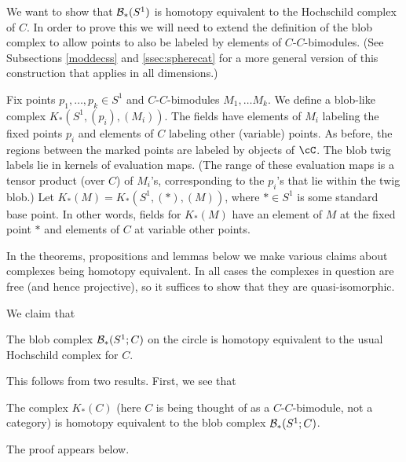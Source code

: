 We want to show that ${\mathcal B}_*(S^1)$ is homotopy equivalent to the
Hochschild complex of $C$.
In order to prove this we will need to extend the 
definition of the blob complex to allow points to also
be labeled by elements of $C$-$C$-bimodules.
(See Subsections \ref{moddecss} and \ref{ssec:spherecat} for a more general version of this construction that applies in all dimensions.)

Fix points $p_1, \ldots, p_k \in S^1$ and $C$-$C$-bimodules $M_1, \ldots M_k$.
We define a blob-like complex $K_*(S^1, (p_i), (M_i))$.
The fields have elements of $M_i$ labeling 
the fixed points $p_i$ and elements of $C$ labeling other (variable) points.
As before, the regions between the marked points are labeled by
objects of $\cC$.
The blob twig labels lie in kernels of evaluation maps.
(The range of these evaluation maps is a tensor product (over $C$) of $M_i$'s,
corresponding to the $p_i$'s that lie within the twig blob.)
Let $K_*(M) = K_*(S^1, (*), (M))$, where $* \in S^1$ is some standard base point.
In other words, fields for $K_*(M)$ have an element of $M$ at the fixed point $*$
and elements of $C$ at variable other points.

In the theorems, propositions and lemmas below we make various claims
about complexes being homotopy equivalent.
In all cases the complexes in question are free (and hence projective), 
so it suffices to show that they are quasi-isomorphic.

We claim that
\begin{thm}
\label{thm:hochschild}
The blob complex ${\mathcal B}_*(S^1; C)$ on the circle is homotopy equivalent to the
usual Hochschild complex for $C$.
\end{thm}

This follows from two results.
First, we see that
\begin{lem}
\label{lem:module-blob}%
The complex $K_*(C)$ (here $C$ is being thought of as a
$C$-$C$-bimodule, not a category) is homotopy equivalent to the blob complex
${\mathcal B}_*(S^1; C)$.
\end{lem}
The proof appears below.

